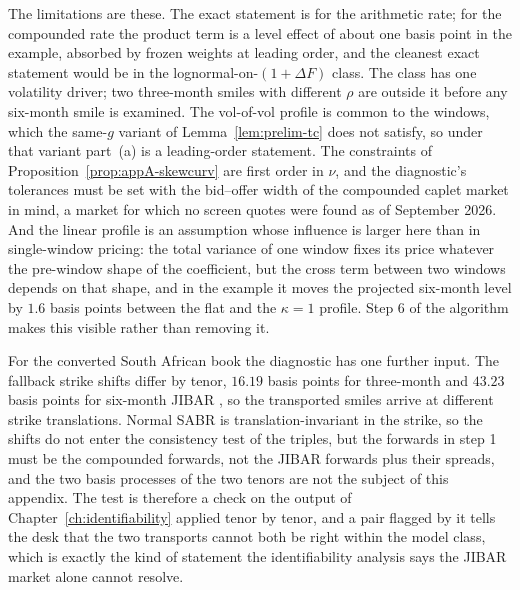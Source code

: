 \documentclass[../../main.tex]{subfiles}
\begin{document}
The limitations are these. The exact statement is for the arithmetic rate; for the compounded rate the product term is a level effect of about one basis point in the example, absorbed by frozen weights at leading order, and the cleanest exact statement would be in the lognormal-on-$(1+\Delta F)$ class. The class has one volatility driver; two three-month smiles with different $\rho$ are outside it before any six-month smile is examined. The vol-of-vol profile is common to the windows, which the same-$g$ variant of Lemma~\ref{lem:prelim-tc} does not satisfy, so under that variant part~(a) is a leading-order statement. The constraints of Proposition~\ref{prop:appA-skewcurv} are first order in $\nu$, and the diagnostic's tolerances must be set with the bid--offer width of the compounded caplet market in mind, a market for which no screen quotes were found as of September 2026. And the linear profile is an assumption whose influence is larger here than in single-window pricing: the total variance of one window fixes its price whatever the pre-window shape of the coefficient, but the cross term between two windows depends on that shape, and in the example it moves the projected six-month level by $1.6$ basis points between the flat and the $\kappa=1$ profile. Step 6 of the algorithm makes this visible rather than removing it.

For the converted South African book the diagnostic has one further input. The fallback strike shifts differ by tenor, $16.19$ basis points for three-month and $43.23$ basis points for six-month JIBAR \cite{bisl2025}, so the transported smiles arrive at different strike translations. Normal SABR is translation-invariant in the strike, so the shifts do not enter the consistency test of the triples, but the forwards in step 1 must be the compounded forwards, not the JIBAR forwards plus their spreads, and the two basis processes of the two tenors are not the subject of this appendix. The test is therefore a check on the output of Chapter~\ref{ch:identifiability} applied tenor by tenor, and a pair flagged by it tells the desk that the two transports cannot both be right within the model class, which is exactly the kind of statement the identifiability analysis says the JIBAR market alone cannot resolve.
\end{document}
